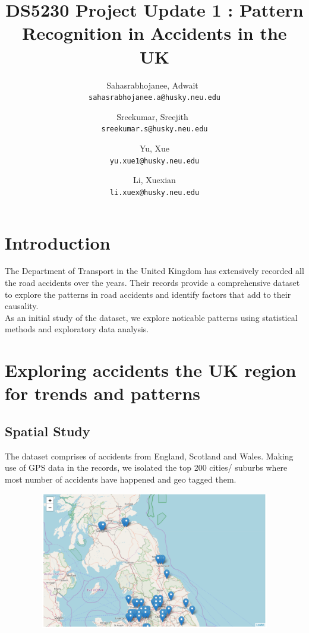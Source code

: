 \documentclass[a4paper, 10pt]{article}
\begin{document}
\title{DS5230 Project Update 1 : Pattern Recognition in Accidents in the UK}


\author{
  Sahasrabhojanee, Adwait\ \\     \texttt{sahasrabhojanee.a@husky.neu.edu}
  \and
  Sreekumar, Sreejith\  \\ \texttt{sreekumar.s@husky.neu.edu}
  \and
  Yu, Xue \\  \texttt{yu.xue1@husky.neu.edu}
  \and
  Li, Xuexian  \\ \texttt{li.xuex@husky.neu.edu}
}
\maketitle
\section{Introduction}
The Department of Transport in the United Kingdom has extensively recorded all the road accidents over the years. Their records provide a comprehensive dataset to
explore the patterns in road accidents and identify factors that add to their causality. \\
  As an initial study of the dataset, we explore noticable patterns using statistical methods and exploratory data analysis. 

\section{Exploring accidents the UK region for trends and patterns }

\subsection{Spatial Study}  
The dataset comprises of accidents from England, Scotland and Wales. Making use of GPS data in the records, we isolated the top 200 cities/ suburbs where most number of
accidents have happened and geo tagged them. \\
    \begin{center}
      \includegraphics[width=70cm,height=6cm, scale=0.4,keepaspectratio]{map1.png}
    \end{center}
\end{document}
